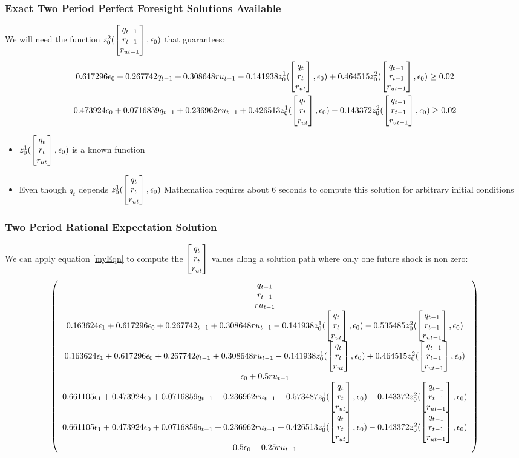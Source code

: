 \documentclass{beamer}
\begin{document}
    \begin{frame}
\frametitle{Exact Two Period Perfect Foresight Solutions  Available}

We will need the function {\small $z_0^2(\begin{bmatrix} q_{t-1}\\r_{t-1}\\r_{ut-1} \end{bmatrix},\epsilon_0)$ }that guarantees:
{\tiny 
\begin{gather*}
    0.617296 \epsilon_0+0.267742 q_{t-1}+0.308648 ru_{t-1}-0.141938
      z_0^1(\begin{bmatrix} q_t\\r_{t}\\r_{ut} \end{bmatrix},\epsilon_0)+0.464515 z_0^2(\begin{bmatrix} q_{t-1}\\r_{t-1}\\r_{ut-1} \end{bmatrix},\epsilon_0) \ge 0.02\\  
    0.473924 \epsilon_0+0.0716859 q_{t-1}+0.236962 ru_{t-1}+0.426513
      z_0^1(\begin{bmatrix} q_t\\r_{t}\\r_{ut} \end{bmatrix},\epsilon_0)-0.143372 z_0^2(\begin{bmatrix} q_{t-1}\\r_{t-1}\\r_{ut-1} \end{bmatrix},\epsilon_0)  \ge 0.02 \\
\end{gather*}
}
\begin{itemize}
\item {\small $z_0^1(\begin{bmatrix} q_t\\r_{t}\\r_{ut} \end{bmatrix},\epsilon_0)$ } is a known function
\item Even though $q_t$ depends {\small $z_0^1(\begin{bmatrix} q_t\\r_{t}\\r_{ut} \end{bmatrix},\epsilon_0)$ } Mathematica requires about 6 seconds to compute this solution for arbitrary initial conditions
\end{itemize}
    \end{frame}

    \begin{frame}
      \frametitle{Two Period Rational Expectation Solution}
We can apply equation \ref{myEqn} to compute the $\begin{bmatrix} q_t\\r_{t}\\r_{ut} \end{bmatrix}$ values along a solution path where only one future shock is non zero:
{\tiny
      \begin{gather*}
           \left(
   \begin{array}{c}
    q_{t-1} \\
    r_{t-1} \\
    ru_{t-1} \\
  0.163624 \epsilon_{1}+0.617296 \epsilon_0+0.267742 _{t-1}+0.308648 ru_{t-1}-0.141938
       z_0^1(\begin{bmatrix} q_t\\r_{t}\\r_{ut} \end{bmatrix},\epsilon_0)-0.535485 z_0^2(\begin{bmatrix} q_{t-1}\\r_{t-1}\\r_{ut-1} \end{bmatrix},\epsilon_0) \\
    0.163624 \epsilon_{1}+0.617296 \epsilon_0+0.267742 q_{t-1}+0.308648 ru_{t-1}-0.141938
      z_0^1(\begin{bmatrix} q_t\\r_{t}\\r_{ut} \end{bmatrix},\epsilon_0)+0.464515 z_0^2(\begin{bmatrix} q_{t-1}\\r_{t-1}\\r_{ut-1} \end{bmatrix},\epsilon_0) \\
    \epsilon_0+0.5 ru_{t-1} \\
    0.661105 \epsilon_{1}+0.473924 \epsilon_0+0.0716859 q_{t-1}+0.236962 ru_{t-1}-0.573487
      z_0^1(\begin{bmatrix} q_t\\r_{t}\\r_{ut} \end{bmatrix},\epsilon_0)-0.143372 z_0^2(\begin{bmatrix} q_{t-1}\\r_{t-1}\\r_{ut-1} \end{bmatrix},\epsilon_0) \\
   0.661105 \epsilon_{1}+ 0.473924 \epsilon_0+0.0716859 q_{t-1}+0.236962 ru_{t-1}+0.426513
      z_0^1(\begin{bmatrix} q_t\\r_{t}\\r_{ut} \end{bmatrix},\epsilon_0)-0.143372 z_0^2(\begin{bmatrix} q_{t-1}\\r_{t-1}\\r_{ut-1} \end{bmatrix},\epsilon_0) \\
    0.5 \epsilon_0+0.25 ru_{t-1} 
   \end{array}
   \right)
      \end{gather*}
}

    \end{frame}
\end{document}
